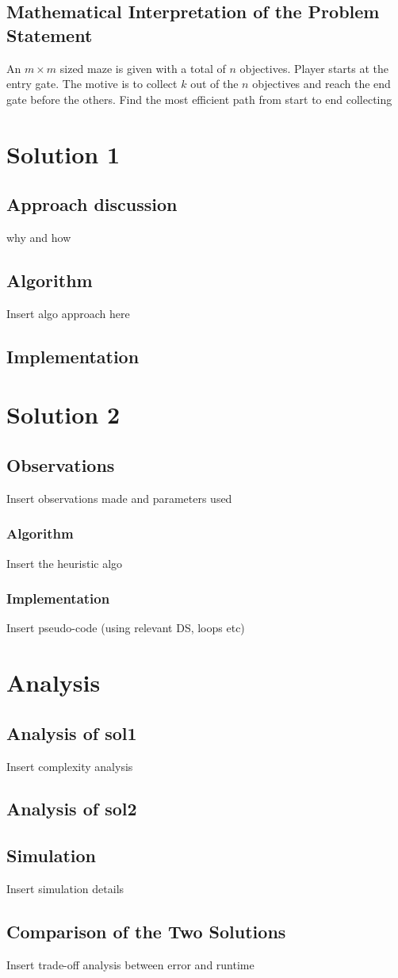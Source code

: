 \documentclass[12pt]{report}
\begin{document}
\section{Mathematical Interpretation of the Problem Statement}

An $m\times m$ sized maze is given with a total of $n$ objectives. Player starts at the entry gate. The motive is to collect $k$ out of the $n$ objectives and reach the end gate before the others. Find the most efficient path from start to end collecting 

\chapter{Solution 1}
\section{Approach discussion}
why and how
\section{Algorithm}
Insert algo approach here

\section {Implementation}

\chapter{Solution 2}

\section{Observations}
Insert observations made and parameters used

\subsection{Algorithm}
Insert the heuristic algo

\subsection{Implementation}
Insert pseudo-code (using relevant DS, loops etc)

\chapter{Analysis}

\section{Analysis of sol1}
Insert complexity analysis
\section{Analysis of sol2}

\section{Simulation}
Insert simulation details

\section{Comparison of the Two Solutions}
Insert trade-off analysis between error and runtime
\end{document}
